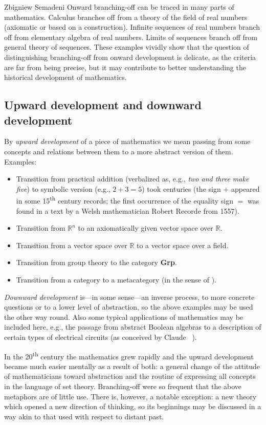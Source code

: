 \begin{artengenv}{Zbigniew Semadeni}
Onward branching-off can be traced in many parts of mathematics.  
Calculus branches off from a theory of the field of real numbers (axiomatic or 
based on a construction). 
Infinite sequences of real numbers branch off from elementary algebra of real numbers. 
Limits of sequences branch off from general theory of sequences. 
These examples vividly show that the question of distinguishing branching-off from 
onward development is delicate, as the criteria are far from being precise, but it 
may contribute to better understanding the historical development of mathematics. 

\subsection{Upward development and downward development}
By \textit{upward development} of a piece of mathematics we mean passing from some 
concepts and relations between them to a more abstract version of them. Examples: 
\begin{itemize}
\item Transition from practical addition (verbalized as, e.g., \textit{two and 
three make five}) to symbolic version (e.g., $2+3=5$) took centuries (the sign $+$ 
appeared in some 15\textsuperscript{th} century records; the first occurrence of the equality 
sign $=$ was found in a text by a Welsh mathematician Robert Recorde from 1557). 
\item Transition from $\mathbb{R}^n$ 
to an axiomatically given vector space over $\mathbb{R}$.  
\item Transition from a vector space over $\mathbb{R}$ 
to a vector space over a field. 
\item Transition from group theory to the category \textbf{Grp}. 
\item Transition from a category to a metacategory (in the sense 
of \parencite[pp.7--11]{Working}). 
\end{itemize}

\textit{Downward development} is---in some sense---an inverse process, 
to more concrete questions or to a lower level of abstraction, so the above examples 
may be used the other way round. Also some typical applications of mathematics 
may be included here, e.g., the passage from abstract Boolean algebras to a 
description of certain types of electrical circuits (as conceived by Claude \citeauthor{Shannon_symbolic_1936}~\parencite*{Shannon_symbolic_1936}).

In the 20\textsuperscript{th} century the mathematics grew rapidly and the upward development became 
much easier mentally as a result of both: a general change of the attitude of 
mathematicians toward abstraction and the routine of expressing all concepts in 
the language of set theory. 
Branching-off were so frequent that the above metaphors are of little use. 
There is, however, a notable exception: a new theory which opened a new direction 
of thinking, so its beginnings may be discussed in a way akin to that used with 
respect to distant past.   


\end{artengenv}
